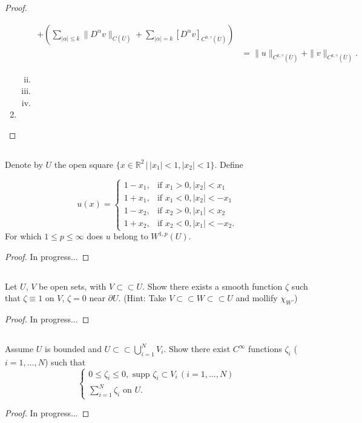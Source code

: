 \documentclass[11pt]{article}
\begin{document}
\begin{proof}
\begin{enumerate}[1.]
\begin{enumerate}[(i)]
\begin{align}
						    + (\sum_{|\alpha| \leq k}\|D^{\alpha}v\|_{C(\overline{U})} + \sum_{|\alpha| = k}[D^{\alpha}v]_{C^{0,\gamma}(\overline{U})})\\
					        &= \|u\|_{C^{k,\gamma}(\overline{U})} + \|v\|_{C^{k,\gamma}(\overline{U})}.
					\end{align}
				\item
				\item
				\item
			\end{enumerate}
		\item
	\end{enumerate}
\end{proof}

\newpage

\setcounter{subsection}{2}
\subsection{}
Denote by $U$ the open square $\{x \in \mathbb{R}^2 \, | \, |x_1| < 1, |x_2| < 1\}$. Define

\[
u(x) =
\begin{cases} 
	1 - x_1, & \text{if } x_1 > 0, |x_2| < x_1 \\
	1 + x_1, & \text{if } x_1 < 0, |x_2| < -x_1 \\
	1 - x_2, & \text{if } x_2 > 0, |x_1| < x_2 \\
	1 + x_2, & \text{if } x_2 < 0, |x_1| < -x_2.
\end{cases}
\]
For which $1 \leq p \leq \infty$ does $u$ belong to $W^{1,p}(U)$.
\begin{proof}
In progress...
\end{proof}

\setcounter{subsection}{4}
\subsection{}
Let $U$, $V$ be open sets, with $V\subset\subset U$. Show there exists a smooth function $\zeta$ such that
$\zeta \equiv 1$ on $V$, $\zeta = 0$ near $\partial U$. (Hint: Take $V \subset\subset W \subset\subset U$ and mollify $\chi_W$.)
\begin{proof}
In progress...
\end{proof}

\subsection{}
Assume $U$ is bounded and $U \subset\subset \bigcup_{i=1}^{N}V_i$. Show there exist $C^{\infty}$ functions $\zeta_i$ ($i=1,\dots,N$)
such that
\[
\begin{cases}
	0 \leq \zeta_i \leq 0, \text{ supp } \zeta_i \subset V_i \,(i=1,\dots,N)\\
	\sum_{i=1}^{N} \zeta_i \text{ on } U.
\end{cases}
\]
\begin{proof}
In progress...
\end{proof}
\end{document}
